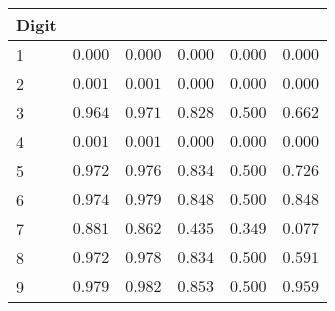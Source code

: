 \begin{table}[!tbp]
\begin{center}
\begin{tabular}{lrrrrr}
\hline\hline
\multicolumn{1}{l}{Digit}&\multicolumn{1}{c}{}&\multicolumn{1}{c}{}&\multicolumn{1}{c}{}&\multicolumn{1}{c}{}&\multicolumn{1}{c}{}\tabularnewline
\hline
1&$0.000$&$0.000$&$0.000$&$0.000$&$0.000$\tabularnewline
2&$0.001$&$0.001$&$0.000$&$0.000$&$0.000$\tabularnewline
3&$0.964$&$0.971$&$0.828$&$0.500$&$0.662$\tabularnewline
4&$0.001$&$0.001$&$0.000$&$0.000$&$0.000$\tabularnewline
5&$0.972$&$0.976$&$0.834$&$0.500$&$0.726$\tabularnewline
6&$0.974$&$0.979$&$0.848$&$0.500$&$0.848$\tabularnewline
7&$0.881$&$0.862$&$0.435$&$0.349$&$0.077$\tabularnewline
8&$0.972$&$0.978$&$0.834$&$0.500$&$0.591$\tabularnewline
9&$0.979$&$0.982$&$0.853$&$0.500$&$0.959$\tabularnewline
\hline
\end{tabular}\end{center}
\end{table}
